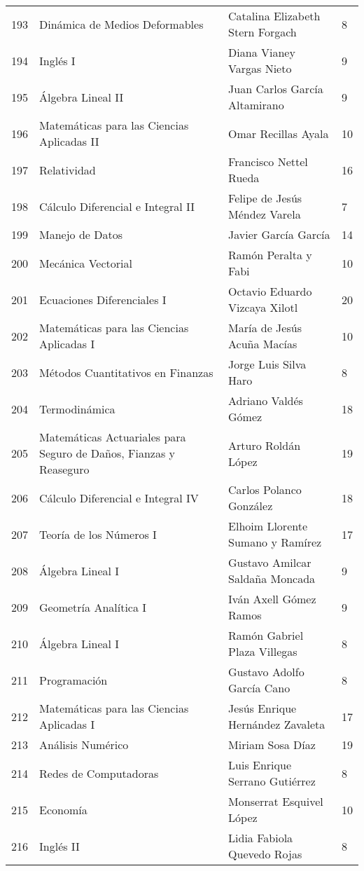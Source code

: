 \begin{table}[ht]
\begin{tabular}{rlll}
  193 & Dinámica de Medios Deformables & Catalina Elizabeth Stern Forgach & 8 \\ 
  194 & Inglés I & Diana Vianey Vargas Nieto & 9 \\ 
  195 & Álgebra Lineal II & Juan Carlos García Altamirano & 9 \\ 
  196 & Matemáticas para las Ciencias Aplicadas II & Omar Recillas Ayala & 10 \\ 
  197 & Relatividad & Francisco Nettel Rueda & 16 \\ 
  198 & Cálculo Diferencial e Integral II & Felipe de Jesús Méndez Varela & 7 \\ 
  199 & Manejo de Datos & Javier García García & 14 \\ 
  200 & Mecánica Vectorial & Ramón Peralta y Fabi & 10 \\ 
  201 & Ecuaciones Diferenciales I & Octavio Eduardo Vizcaya Xilotl & 20 \\ 
  202 & Matemáticas para las Ciencias Aplicadas I & María de Jesús Acuña Macías & 10 \\ 
  203 & Métodos Cuantitativos en Finanzas & Jorge Luis Silva Haro & 8 \\ 
  204 & Termodinámica & Adriano Valdés Gómez & 18 \\ 
  205 & Matemáticas Actuariales para Seguro de Daños, Fianzas y Reaseguro & Arturo Roldán López & 19 \\ 
  206 & Cálculo Diferencial e Integral IV & Carlos Polanco González & 18 \\ 
  207 & Teoría de los Números I & Elhoim Llorente Sumano y Ramírez & 17 \\ 
  208 & Álgebra Lineal I & Gustavo Amilcar Saldaña Moncada & 9 \\ 
  209 & Geometría Analítica I & Iván Axell Gómez Ramos & 9 \\ 
  210 & Álgebra Lineal I & Ramón Gabriel Plaza Villegas & 8 \\ 
  211 & Programación & Gustavo Adolfo García Cano & 8 \\ 
  212 & Matemáticas para las Ciencias Aplicadas I & Jesús Enrique Hernández Zavaleta & 17 \\ 
  213 & Análisis Numérico & Miriam Sosa Díaz & 19 \\ 
  214 & Redes de Computadoras & Luis Enrique Serrano Gutiérrez & 8 \\ 
  215 & Economía & Monserrat Esquivel López & 10 \\ 
  216 & Inglés II & Lidia Fabiola Quevedo Rojas & 8 \\ 

\end{tabular}
\end{table}
